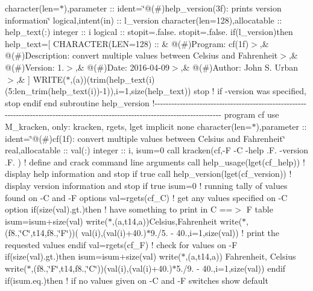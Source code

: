 character(len=$\ast$),parameter \+:: ident=\char`\"{}@(\#)help\+\_\+version(3f)\+: prints version information\char`\"{} logical,intent(in) \+:: l\+\_\+version character(len=128),allocatable \+:: help\+\_\+text(\+:) integer \+:: i logical \+:: stopit=.\+false. stopit=.\+false. if(l\+\_\+version)then help\+\_\+text=\mbox{[} C\+H\+A\+R\+A\+C\+T\+E\+R(\+L\+E\+N=128) \+:: \& \textquotesingle{}@(\#)\+Program\+: cf(1f)$>$\textquotesingle{},\& \textquotesingle{}@(\#)\+Description\+: convert multiple values between Celsius and Fahrenheit$>$\textquotesingle{},\& \textquotesingle{}@(\#)\+Version\+: 1.$>$\textquotesingle{},\& \textquotesingle{}@(\#)\+Date\+: 2016-\/04-\/09$>$\textquotesingle{},\& \textquotesingle{}@(\#)\+Author\+: John S. Urban$>$\textquotesingle{},\& \textquotesingle{}\textquotesingle{}\mbox{]} W\+R\+I\+T\+E($\ast$,\textquotesingle{}(a)\textquotesingle{})(trim(help\+\_\+text(i)(5\+:len\+\_\+trim(help\+\_\+text(i))-\/1)),i=1,size(help\+\_\+text)) stop ! if -\/version was specified, stop endif end subroutine help\+\_\+version !-\/-\/-\/-\/-\/-\/-\/-\/-\/-\/-\/-\/-\/-\/-\/-\/-\/-\/-\/-\/-\/-\/-\/-\/-\/-\/-\/-\/-\/-\/-\/-\/-\/-\/-\/-\/-\/-\/-\/-\/-\/-\/-\/-\/-\/-\/-\/-\/-\/-\/-\/-\/-\/-\/-\/-\/-\/-\/-\/-\/-\/-\/-\/-\/-\/-\/-\/-\/-\/-\/-\/-\/-\/-\/-\/-\/-\/-\/-\/-\/-\/-\/-\/-\/-\/-\/-\/-\/-\/-\/-\/-\/-\/-\/-\/-\/-\/-\/-\/-\/-\/-\/-\/-\/-\/-\/-\/-\/-\/-\/-\/-\/-\/-\/-\/-\/-\/-\/-\/-\/-\/-\/-\/-\/-\/-\/-\/-\/-\/-\/-\/ program cf use M\+\_\+kracken, only\+: kracken, rgets, lget implicit none character(len=$\ast$),parameter \+:: ident=\char`\"{}@(\#)cf(1f)\+: convert multiple values between Celsius and Fahrenheit\char`\"{} real,allocatable \+:: val(\+:) integer \+:: i, isum=0 call kracken(\textquotesingle{}cf\textquotesingle{},\textquotesingle{}-\/\+F -\/\+C -\/help .\+F. -\/version .\+F.\textquotesingle{} ) ! define and crack command line arguments call help\+\_\+usage(lget(\textquotesingle{}cf\+\_\+help\textquotesingle{})) ! display help information and stop if true call help\+\_\+version(lget(\textquotesingle{}cf\+\_\+version\textquotesingle{})) ! display version information and stop if true isum=0 ! running tally of values found on -\/\+C and -\/\+F options val=rgets(\textquotesingle{}cf\+\_\+\+C\textquotesingle{}) ! get any values specified on -\/\+C option if(size(val).\+gt.)then ! have something to print in C ==$>$ F table isum=isum+size(val) write($\ast$,\textquotesingle{}(a,t14,a)\textquotesingle{})\textquotesingle{}\+Celsius\textquotesingle{},\textquotesingle{}\+Fahrenheit\textquotesingle{} write($\ast$,\textquotesingle{}(f8.,\char`\"{}\+C\char`\"{},t14,f8.,\char`\"{}\+F\char`\"{})\textquotesingle{})( val(i),(val(i)+40.)$\ast$9./5. -\/ 40.,i=1,size(val)) ! print the requested values endif val=rgets(\textquotesingle{}cf\+\_\+\+F\textquotesingle{}) ! check for values on -\/\+F if(size(val).\+gt.)then isum=isum+size(val) write($\ast$,\textquotesingle{}(a,t14,a)\textquotesingle{}) \textquotesingle{}\+Fahrenheit\textquotesingle{}, \textquotesingle{}\+Celsius\textquotesingle{} write($\ast$,\textquotesingle{}(f8.,\char`\"{}\+F\char`\"{},t14,f8.,\char`\"{}\+C\char`\"{})\textquotesingle{})(val(i),(val(i)+40.)$\ast$5./9. -\/ 40.,i=1,size(val)) endif if(isum.\+eq.)then ! if no values given on -\/\+C and -\/\+F switches show default 